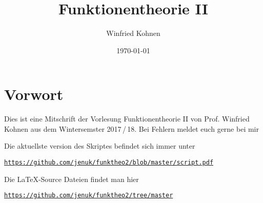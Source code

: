 \documentclass[]{scrbook}
\title{Funktionentheorie II}
\author{Winfried Kohnen}
\date{\today}
\begin{document}
\pagestyle{plain}

\maketitle

\chapter*{Vorwort}

Dies ist eine Mitschrift der Vorlesung Funktionentheorie II von Prof. Winfried Kohnen aus dem Wintersemster 2017\,/\,18.
Bei Fehlern meldet euch gerne bei mir

\begin{center}
\end{center}

Die aktuellste version des Skriptes befindet sich immer unter
\begin{center}
\texttt{\url{https://github.com/jenuk/funktheo2/blob/master/script.pdf}}
\end{center}

Die \LaTeX-Source Dateien findet man hier
\begin{center}
\texttt{\url{https://github.com/jenuk/funktheo2/tree/master}}
\end{center}

\tableofcontents
\clearpage

\setcounter{page}{0}
\pagestyle{fancy}






\end{document}
